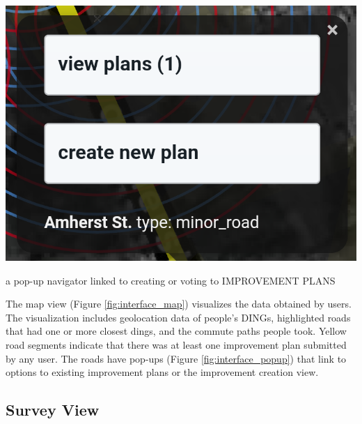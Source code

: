 \begin{marginfigure}[{0cm}]
  \includegraphics{chapters/4/fig/interface_popup.png}               
  \caption[interface: Popup]{a pop-up navigator linked to creating or
  voting to IMPROVEMENT PLANS}
  \label{fig:interface_popup}
\end{marginfigure}

The map view (Figure \ref{fig:interface_map}) visualizes the data obtained by users. The visualization includes geolocation data of people's DINGs, highlighted roads that had one or more closest dings, and the commute paths people took. Yellow road segments indicate that there was at least one improvement plan submitted by any user. The roads have pop-ups (Figure \ref{fig:interface_popup}) that link to options to existing improvement plans or the improvement creation view.

\subsection{Survey View}

